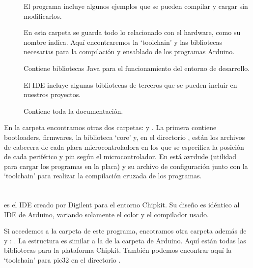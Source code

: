 \begin{description}
	\item[] El programa incluye algunos ejemplos que se pueden compilar y cargar sin modificarlos. 
	\item[] En esta carpeta se guarda todo lo relacionado con el hardware, como su nombre indica. Aquí encontraremos la `toolchain' y las bibliotecas necesarias para la compilación y ensablado de los programas Arduino.
	\item[] Contiene bibliotecas Java para el funcionamiento del entorno de desarrollo.
		\item[] El IDE incluye algunas bibliotecas de terceros que se pueden incluir en nuestros proyectos.
		\item[] Contiene toda la documentación.
\end{description}

En la carpeta  encontramos otras dos carpetas:  y .  La primera contiene bootloaders, firmwares, la biblioteca `core' y, en el directorio , están los archivos de cabecera de cada placa microcontroladora en los que se especifica la posición de cada periférico y pin según el microcontrolador.  En  está avrdude (utilidad para cargar los programas en la placa) y su archivo de configuración junto con la `toolchain'  para realizar la compilación cruzada de los programas.

\section{}
\cite{website:mpide} es el IDE creado por Digilent para el entorno Chipkit. Su diseño es idéntico al IDE de Arduino, variando solamente el color y el compilador usado.


Si accedemos a la carpeta  de este programa, encotramos otra carpeta además de  y : . La estructura es similar  a la de la carpeta de Arduino. Aquí están todas las bibliotecas para la plataforma Chipkit. También podemos encontrar aquí la `toolchain'  para pic32 en el directorio .

